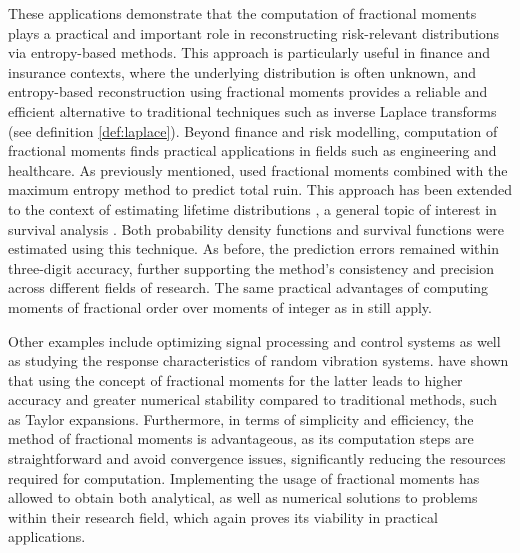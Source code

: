  These applications demonstrate that the computation of fractional moments plays a practical and important role in reconstructing risk-relevant distributions via entropy-based methods. This approach is particularly useful in finance and insurance contexts, where the underlying distribution is often unknown, and entropy-based reconstruction using fractional moments provides a reliable and efficient alternative to traditional techniques such as inverse Laplace transforms (see definition \ref{def:laplace}).
\newline
Beyond finance and risk modelling, computation of fractional moments finds practical applications in fields such as engineering and healthcare. As previously mentioned, \citet{gyzl2013} used fractional moments combined with the maximum entropy method to predict total ruin. This approach has been extended to the context of estimating lifetime distributions \citep{gyzl2024}, a general topic of interest in survival analysis \citep{clark2003}. Both probability density functions and survival functions were estimated using this technique. As before, the prediction errors remained within three-digit accuracy, further supporting the method’s consistency and precision across different fields of research. The same practical advantages of computing moments of fractional order over moments of integer as in \citet{gyzl2013} still apply.

Other examples include optimizing signal processing and control systems as well as studying the response characteristics of random vibration systems. \citet{wang2025} have shown that using the concept of fractional moments for the latter leads to higher  accuracy and greater numerical stability compared to traditional methods, such as Taylor expansions. Furthermore, in terms of simplicity and efficiency, the method of fractional moments is advantageous, as its computation steps are straightforward and avoid convergence issues, significantly reducing the resources required for computation. Implementing the usage of fractional moments has allowed \citet{wang2025} to obtain both analytical, as well as numerical solutions to problems within their research field, which again proves its viability in practical applications. 

